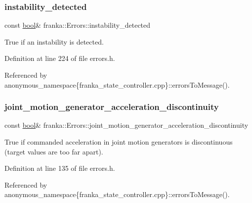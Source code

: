 \subsubsection{\texorpdfstring{instability\+\_\+detected}{instability\_detected}}
{\footnotesize\ttfamily const \hyperlink{classbool}{bool}\& franka\+::\+Errors\+::instability\+\_\+detected}

True if an instability is detected. 

Definition at line 224 of file errors.\+h.



Referenced by anonymous\+\_\+namespace\{franka\+\_\+state\+\_\+controller.\+cpp\}\+::errors\+To\+Message().

\mbox{\label{structfranka_1_1Errors_a633195adca91f5ecaf1506da12f3311f}} 
\subsubsection{\texorpdfstring{joint\+\_\+motion\+\_\+generator\+\_\+acceleration\+\_\+discontinuity}{joint\_motion\_generator\_acceleration\_discontinuity}}
{\footnotesize\ttfamily const \hyperlink{classbool}{bool}\& franka\+::\+Errors\+::joint\+\_\+motion\+\_\+generator\+\_\+acceleration\+\_\+discontinuity}

True if commanded acceleration in joint motion generators is discontinuous (target values are too far apart). 

Definition at line 135 of file errors.\+h.



Referenced by anonymous\+\_\+namespace\{franka\+\_\+state\+\_\+controller.\+cpp\}\+::errors\+To\+Message().

\mbox{\label{structfranka_1_1Errors_a9536ad072868b90525c56143cbb956ef}} 
